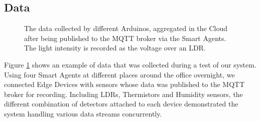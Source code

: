 

\subsection{Data}

\begin{figure}
    \centering
    \caption{The data collected by different Arduinos, aggregated in the Cloud after being published to the MQTT broker via the Smart Agents. The light intensity is recorded as the voltage over an LDR.}
    \label{fig:graph}
\end{figure}

Figure \ref{fig:graph} shows an example of data that was collected during a test of our system. Using four Smart Agents at different places around the office overnight, we connected Edge Devices with sensors whose data was published to the MQTT broker for recording. Including LDRs, Thermistors and Humidity sensors, the different combination of detectors attached to each device demonstrated the system handling various data streams concurrently.

